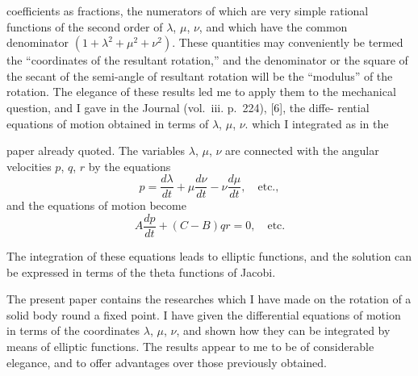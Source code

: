 \documentclass[11pt,a4paper]{article}
\begin{document}
coefficients as fractions, the numerators of which are very simple rational functions of
the second order of $\lambda$, $\mu$, $\nu$, and which have the common denominator $(1 + \lambda^2 + \mu^2 + \nu^2)$.
These quantities may conveniently be termed the ``coordinates of the resultant rotation,''
and the denominator or the square of the secant of the semi-angle of resultant rotation
will be the ``modulus'' of the rotation. The elegance of these results led me to apply
them to the mechanical question, and I gave in the Journal (vol.~iii. p.~224), [6], the diffe-
rential equations of motion obtained in terms of $\lambda$, $\mu$, $\nu$. which I integrated as in the

\newpage
\setcounter{page}{239}

paper already quoted. The variables $\lambda$, $\mu$, $\nu$ are connected with the angular velocities
$p$, $q$, $r$ by the equations
\[
p = \frac{d\lambda}{dt} + \mu\frac{d\nu}{dt} - \nu\frac{d\mu}{dt}, \quad \text{etc.},
\]
and the equations of motion become
\[
A\frac{dp}{dt} + (C-B)qr = 0, \quad \text{etc.}
\]

The integration of these equations leads to elliptic functions, and the solution can
be expressed in terms of the theta functions of Jacobi.

\newpage
\setcounter{page}{240}

The present paper contains the researches which I have made on the rotation of a
solid body round a fixed point. I have given the differential equations of motion in
terms of the coordinates $\lambda$, $\mu$, $\nu$, and shown how they can be integrated by means of
elliptic functions. The results appear to me to be of considerable elegance, and to offer
advantages over those previously obtained.
\end{document}
